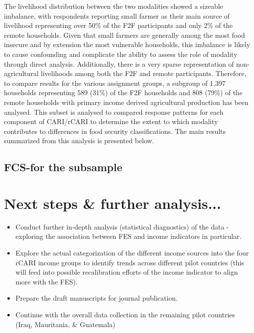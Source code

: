 \documentclass[11pt,harvard]{article}
\begin{document}
	The livelihood distribution between the two modalities showed a sizeable imbalance, with respondents reporting small farmer as their main source of livelihood representing over 50\% of the F2F participants and only 2\% of the remote households. Given that small farmers are generally among the most food insecure and by extension the most vulnerable households, this imbalance is likely to cause confounding and complicate the ability to assess the role of modality through direct analysis. Additionally, there is a very sparse representation of non-agricultural livelihoods among both the F2F and remote participants. Therefore, to compare results for the various assignment groups, a subgroup of 1,397 households representing 589 (31\%) of the F2F households and 808 (79\%) of the remote households with primary income derived agricultural production has been analysed. This subset is analysed to compared response patterns for each component of CARI/rCARI to determine the extent to which modality contributes to differences in food security classifications. The main results summarized from this analysis is presented below.
	
	\subsection{FCS-for the subsample}
	
	\pagebreak
	
	\section{Next steps \& further analysis...}
	
	\begin{itemize}[label=--, left=2.5em]
		\item[1.] Conduct further in-depth analysis (statistical diagnostics)  of the data - exploring the association between FES and income indicators in particular.
		\item[2.] Explore the actual categorization of the different income sources into the four rCARI income groups to identify trends across different pilot countries (this will feed into possible recalibration efforts of the income indicator to align more with the FES).
		\item[3.] Prepare the draft manuscripts for  journal publication.	
		\item[4.] Continue with the overall data collection in the remaining pilot countries (Iraq, Mauritania, \& Guatemala)
	\end{itemize} 
	
\end{document}
